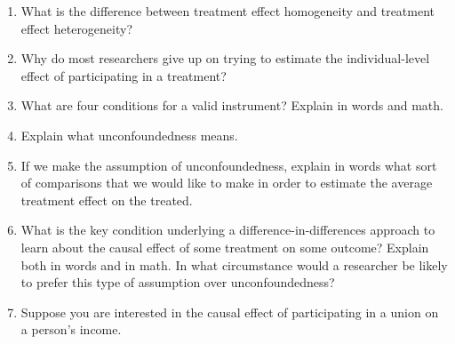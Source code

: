 \documentclass[
  letterpaper,
  DIV=11,
  numbers=noendperiod]{scrreprt}
\begin{document}
\begin{enumerate}
\def\labelenumi{\arabic{enumi}.}
\item
  What is the difference between treatment effect homogeneity and
  treatment effect heterogeneity?
\item
  Why do most researchers give up on trying to estimate the
  individual-level effect of participating in a treatment?
\item
  What are four conditions for a valid instrument? Explain in words and
  math.
\item
  Explain what unconfoundedness means.
\item
  If we make the assumption of unconfoundedness, explain in words what
  sort of comparisons that we would like to make in order to estimate
  the average treatment effect on the treated.
\item
  What is the key condition underlying a difference-in-differences
  approach to learn about the causal effect of some treatment on some
  outcome? Explain both in words and in math. In what circumstance would
  a researcher be likely to prefer this type of assumption over
  unconfoundedness?
\item
  Suppose you are interested in the causal effect of participating in a
  union on a person's income.


\end{enumerate}
\end{document}
